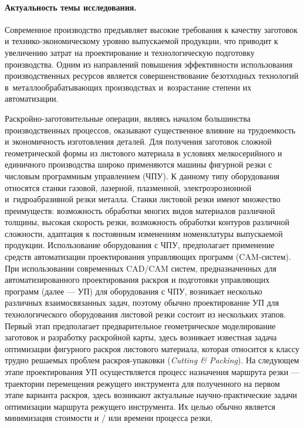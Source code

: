 \paragraph*{Актуальность темы исследования.}

Современное производство предъявляет высокие требования к качеству заготовок и
технико-экономическому уровню выпускаемой продукции,
что приводит к увеличению затрат на проектирование и технологическую подготовку производства.
Одним из направлений повышения эффективности использования
производственных ресурсов является совершенствование безотходных технологий
в~металлообрабатывающих производствах и~возрастание степени их автоматизации.

Раскройно-заготовительные операции,
являясь началом большинства производственных процессов,
оказывают существенное влияние на трудоемкость
и экономичность изготовления деталей.
Для получения заготовок сложной
геометрической формы из листового материала в условиях мелкосерийного и
единичного производства широко применяются машины фигурной резки с
числовым программным управлением
(ЧПУ).
К данному типу оборудования
относятся станки газовой, лазерной, плазменной, электроэрозионной
и~гидроабразивной резки металла.
Станки листовой резки имеют множество преимуществ:
возможность обработки многих видов материалов различной толщины,
высокая скорость резки, возможность обработки контуров различной сложности,
адаптация к постоянным изменениям номенклатуры выпускаемой продукции.
Использование оборудования с ЧПУ, предполагает применение
средств автоматизации проектирования управляющих программ
(CAM-систем).
При использовании современных CAD/CAM систем, предназначенных для
автоматизированного проектирования раскроя и подготовки
управляющих программ
(далее --- УП)
для оборудования с ЧПУ,
возникает несколько различных взаимосвязанных задач,
поэтому обычно
проектирование УП для технологического оборудования листовой резки
состоит из нескольких этапов.
Первый этап предполагает предварительное геометрическое моделирование заготовок
и разработку раскройной карты,
здесь
возникает известная задача оптимизации фигурного раскроя листового материала,
которая
относится к классу трудно решаемых проблем раскроя-упаковки
(\textit{Cutting \& Packing}).
На следующем этапе проектирования УП осуществляется процесс назначения
маршрута резки ---
траектории перемещения режущего инструмента
для полученного на первом этапе варианта раскроя,
здесь
возникают актуальные научно-практические задачи
оптимизации маршрута режущего инструмента.
Их целью обычно является минимизация стоимости и / или времени процесса резки,
